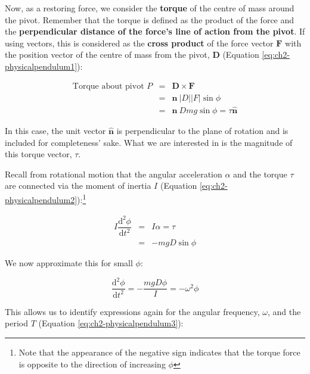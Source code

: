 \documentclass[
]{book}
\begin{document}
Now, as a restoring force, we consider the \textbf{torque} of the centre of mass around the pivot. Remember that the torque is defined as the product of the force and the \textbf{perpendicular distance of the force's line of action from the pivot}. If using vectors, this is considered as the \textbf{cross product} of the force vector \(\mathbf{F}\) with the position vector of the centre of mass from the pivot, \(\mathbf{D}\) (Equation \eqref{eq:ch2-physicalpendulum1}):

\begin{equation}
\begin{array}{rcl}
\textrm{Torque about pivot $P$} &=& \mathbf{D} \times \mathbf{F} \\
&=& \mathbf{\hat{n}}~ |D| |F| \sin \phi \\
&=& \mathbf{\hat{n}}~ D mg  \sin \phi = \tau \mathbf{\hat{n}} 
\end{array}
\label{eq:ch2-physicalpendulum1}
\end{equation}

In this case, the unit vector \(\mathbf{\hat{n}}\) is perpendicular to the plane of rotation and is included for completeness' sake. What we are interested in is the magnitude of this torque vector, \(\tau\).

Recall from rotational motion that the angular acceleration \(\alpha\) and the torque \(\tau\) are connected via the moment of inertia \(I\) (Equation \eqref{eq:ch2-physicalpendulum2}):\footnote{Note that the appearance of the negative sign indicates that the torque force is opposite to the direction of increasing \(\phi\)}

\begin{equation}
\begin{array}{rcl}
I \dfrac{\mathrm{d}^2 \phi}{\mathrm{d} t^2}  &=& I\alpha =\tau \\
&=& -mgD \sin \phi
\end{array}
\label{eq:ch2-physicalpendulum2}
\end{equation}

We now approximate this for small \(\phi\):

\begin{equation}
\frac{\mathrm{d}^2 \phi}{\mathrm{d} t^2} = -\frac{mgD\phi}{I} = -\omega^2 \phi
\end{equation}

This allows us to identify expressions again for the angular frequency, \(\omega\), and the period \(T\) (Equation \eqref{eq:ch2-physicalpendulum3}):
\end{document}
